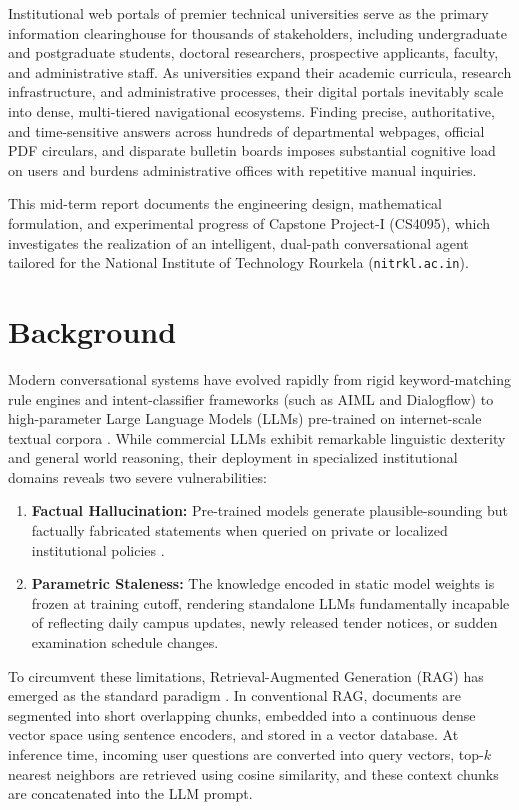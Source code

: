 \documentclass[12pt,a4paper]{report}
\begin{document}
Institutional web portals of premier technical universities serve as the primary information clearinghouse for thousands of stakeholders, including undergraduate and postgraduate students, doctoral researchers, prospective applicants, faculty, and administrative staff. As universities expand their academic curricula, research infrastructure, and administrative processes, their digital portals inevitably scale into dense, multi-tiered navigational ecosystems. Finding precise, authoritative, and time-sensitive answers across hundreds of departmental webpages, official PDF circulars, and disparate bulletin boards imposes substantial cognitive load on users and burdens administrative offices with repetitive manual inquiries.

This mid-term report documents the engineering design, mathematical formulation, and experimental progress of Capstone Project-I (CS4095), which investigates the realization of an intelligent, dual-path conversational agent tailored for the National Institute of Technology Rourkela (\texttt{nitrkl.ac.in}).

\section{Background}
Modern conversational systems have evolved rapidly from rigid keyword-matching rule engines and intent-classifier frameworks (such as AIML and Dialogflow) to high-parameter Large Language Models (LLMs) pre-trained on internet-scale textual corpora \cite{vaswani2017attention, brown2020language}. While commercial LLMs exhibit remarkable linguistic dexterity and general world reasoning, their deployment in specialized institutional domains reveals two severe vulnerabilities:
\begin{enumerate}
    \item \textbf{Factual Hallucination:} Pre-trained models generate plausible-sounding but factually fabricated statements when queried on private or localized institutional policies \cite{ji2023survey}.
    \item \textbf{Parametric Staleness:} The knowledge encoded in static model weights is frozen at training cutoff, rendering standalone LLMs fundamentally incapable of reflecting daily campus updates, newly released tender notices, or sudden examination schedule changes.
\end{enumerate}

To circumvent these limitations, Retrieval-Augmented Generation (RAG) has emerged as the standard paradigm \cite{lewis2020retrieval}. In conventional RAG, documents are segmented into short overlapping chunks, embedded into a continuous dense vector space using sentence encoders, and stored in a vector database. At inference time, incoming user questions are converted into query vectors, top-$k$ nearest neighbors are retrieved using cosine similarity, and these context chunks are concatenated into the LLM prompt.
\end{document}
